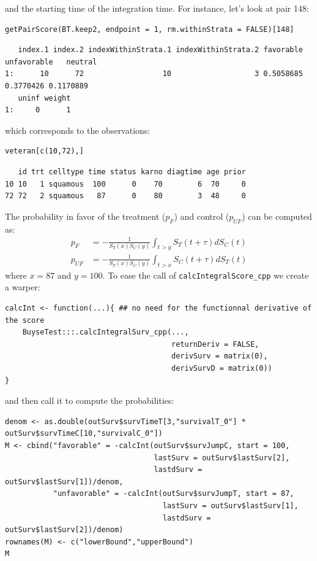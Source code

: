 \documentclass[12pt]{article}
\begin{document}
and the starting time of the integration time. For instance, let's
look at pair 148:
\lstset{language=r,label= ,caption= ,captionpos=b,numbers=none}
\begin{lstlisting}
getPairScore(BT.keep2, endpoint = 1, rm.withinStrata = FALSE)[148]
\end{lstlisting}

\begin{verbatim}
   index.1 index.2 indexWithinStrata.1 indexWithinStrata.2 favorable unfavorable   neutral
1:      10      72                  10                   3 0.5058685   0.3770426 0.1170889
   uninf weight
1:     0      1
\end{verbatim}


which corresponds to the observations:
\lstset{language=r,label= ,caption= ,captionpos=b,numbers=none}
\begin{lstlisting}
veteran[c(10,72),]
\end{lstlisting}

\begin{verbatim}
   id trt celltype time status karno diagtime age prior
10 10   1 squamous  100      0    70        6  70     0
72 72   2 squamous   87      0    80        3  48     0
\end{verbatim}


The probability in favor of the treatment (\(p_F\)) and control (\(p_{UF}\)) can be computed
as:
\begin{align*}
p_F &= -\frac{1}{S_T(x)S_C(y)}\int_{t>y} S_T(t+\tau) dS_C(t) \\
p_{UF} &= -\frac{1}{S_T(x)S_C(y)}\int_{t>x} S_C(t+\tau) dS_T(t)
\end{align*}
where \(x=87\) and \(y=100\). To ease the call of \texttt{calcIntegralScore\_cpp} we create a warper:
\lstset{language=r,label= ,caption= ,captionpos=b,numbers=none}
\begin{lstlisting}
calcInt <- function(...){ ## no need for the functionnal derivative of the score 
    BuyseTest:::.calcIntegralSurv_cpp(..., 
                                      returnDeriv = FALSE, 
                                      derivSurv = matrix(0), 
                                      derivSurvD = matrix(0))
}
\end{lstlisting}

and then call it to compute the probabilities:
\lstset{language=r,label= ,caption= ,captionpos=b,numbers=none}
\begin{lstlisting}
denom <- as.double(outSurv$survTimeT[3,"survivalT_0"] * outSurv$survTimeC[10,"survivalC_0"])
M <- cbind("favorable" = -calcInt(outSurv$survJumpC, start = 100, 
                                  lastSurv = outSurv$lastSurv[2],
                                  lastdSurv = outSurv$lastSurv[1])/denom,
           "unfavorable" = -calcInt(outSurv$survJumpT, start = 87, 
                                    lastSurv = outSurv$lastSurv[1],
                                    lastdSurv = outSurv$lastSurv[2])/denom)
rownames(M) <- c("lowerBound","upperBound")
M
\end{lstlisting}
\end{document}
